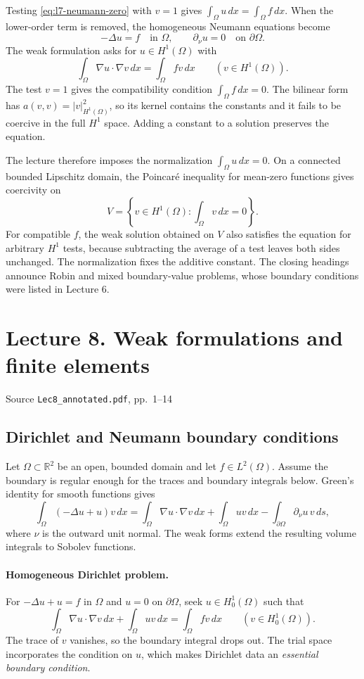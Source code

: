 \documentclass[11pt,a4paper]{article}
\newcommand{\lecturesource}[1]{%
  \par{\small\sffamily\color{Muted}#1}\par\vspace{0.15em}}
\begin{document}
Testing \eqref{eq:l7-neumann-zero} with \(v=1\) gives
\(\int_\Omega u\,dx=\int_\Omega f\,dx\).
When the lower-order term is removed, the homogeneous
Neumann equations become
\[
  -\Delta u=f\quad\text{in }\Omega,\qquad
  \partial_\nu u=0\quad\text{on }\partial\Omega .
\]
The weak formulation asks for \(u\in H^1(\Omega)\) with
\[
  \int_\Omega\nabla u\cdot\nabla v\,dx=\int_\Omega f v\,dx
  \qquad(v\in H^1(\Omega)).
\]
The test \(v=1\) gives the compatibility condition
\(\int_\Omega f\,dx=0\). The bilinear form has
\(a(v,v)=|v|_{H^1(\Omega)}^2\), so its kernel contains
the constants and it fails to be coercive in the full
\(H^1\) space. Adding a constant to a solution preserves
the equation.

The lecture therefore imposes the normalization
\(\int_\Omega u\,dx=0\). On a connected bounded Lipschitz
domain, the Poincar\'e inequality for mean-zero functions
gives coercivity on
\[
  V=\left\{v\in H^1(\Omega):\int_\Omega v\,dx=0\right\}.
\]
For compatible \(f\), the weak solution obtained on \(V\)
also satisfies the equation for arbitrary \(H^1\) tests,
because subtracting the average of a test leaves both sides
unchanged. The normalization fixes the additive constant.
The closing headings announce Robin and mixed boundary-value
problems, whose boundary conditions were listed in Lecture 6.

\clearpage
\section{Lecture 8. Weak formulations and finite elements}
\lecturesource{Source \enspace\texttt{Lec8\_annotated.pdf}, pp.~1--14}

\subsection{Dirichlet and Neumann boundary conditions}

Let \(\Omega\subset\mathbb R^2\) be an open, bounded domain and let
\(f\in L^2(\Omega)\). Assume the boundary is regular enough for the traces and
boundary integrals below. Green's identity for smooth functions gives
\[
 \int_\Omega(-\Delta u+u)v\,dx
 =\int_\Omega\nabla u\cdot\nabla v\,dx+\int_\Omega uv\,dx
   -\int_{\partial\Omega}\partial_\nu u\,v\,ds,
\]
where \(\nu\) is the outward unit normal. The weak forms extend the resulting
volume integrals to Sobolev functions.

\paragraph{Homogeneous Dirichlet problem.}
For \(-\Delta u+u=f\) in \(\Omega\) and \(u=0\) on \(\partial\Omega\),
seek \(u\in H_0^1(\Omega)\) such that
\[
 \int_\Omega \nabla u\cdot\nabla v\,dx+\int_\Omega uv\,dx
 =\int_\Omega fv\,dx
 \qquad (v\in H_0^1(\Omega)).
\]
The trace of \(v\) vanishes, so the boundary integral drops out. The trial
space incorporates the condition on \(u\), which makes Dirichlet data an
\emph{essential boundary condition}.
\end{document}
